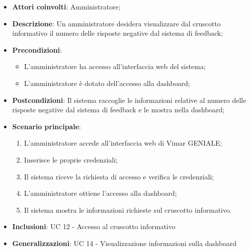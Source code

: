 \begin{itemize}
    \item \textbf{Attori coinvolti}: Amministratore;
    \item \textbf{Descrizione}: Un amministratore desidera visualizzare dal cruscotto informativo il numero delle risposte negative dal sistema di feedback;
    \item \textbf{Precondizioni}: 
        \begin{itemize}
            \item L’amministratore ha accesso all’interfaccia web del sistema;
            \item L’amministratore è dotato dell’accesso alla dashboard;
        \end{itemize}
    \item \textbf{Postcondizioni}: Il sistema raccoglie le informazioni relative al numero delle risposte negative dal sistema di feedback e le mostra nella dashboard;
    \item \textbf{Scenario principale}:
    \begin{enumerate}
    \item L’amministratore accede all’interfaccia web di Vimar GENIALE;
    \item Inserisce le proprie credenziali;
    \item Il sistema riceve la richiesta di accesso e verifica le credenziali;
    \item L’amministratore ottiene l’accesso alla dashboard;
    \item Il sistema mostra le informazioni richieste sul cruscotto informativo.
    \end{enumerate}
    \item \textbf{Inclusioni}: UC 12 - Accesso al cruscotto informativo
    \item \textbf{Generalizzazioni}: UC 14 - Visualizzazione informazioni sulla dashboard
\end{itemize}
